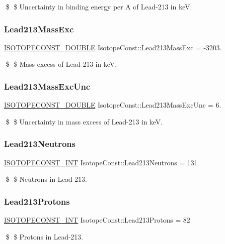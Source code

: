 \$ \$ Uncertainty in binding energy per A of Lead-\/213 in keV. \mbox{\label{group___isotope_const-_lead-_pb213_gabfbf46e8e0e777dba7a1adaa9d711347}} 
\subsubsection{\texorpdfstring{Lead213\+Mass\+Exc}{Lead213MassExc}}
{\footnotesize\ttfamily \mbox{\hyperlink{group___isotope_const-_macros_ga8f45a7272ce02c0b4c65c44636ed719a}{I\+S\+O\+T\+O\+P\+E\+C\+O\+N\+S\+T\+\_\+\+D\+O\+U\+B\+LE}} Isotope\+Const\+::\+Lead213\+Mass\+Exc = -\/3203.}

\$ \$ Mass excess of Lead-\/213 in keV. \mbox{\label{group___isotope_const-_lead-_pb213_ga3eed443824fa9a9b4589a464d3347891}} 
\subsubsection{\texorpdfstring{Lead213\+Mass\+Exc\+Unc}{Lead213MassExcUnc}}
{\footnotesize\ttfamily \mbox{\hyperlink{group___isotope_const-_macros_ga8f45a7272ce02c0b4c65c44636ed719a}{I\+S\+O\+T\+O\+P\+E\+C\+O\+N\+S\+T\+\_\+\+D\+O\+U\+B\+LE}} Isotope\+Const\+::\+Lead213\+Mass\+Exc\+Unc = 6.}

\$ \$ Uncertainty in mass excess of Lead-\/213 in keV. \mbox{\label{group___isotope_const-_lead-_pb213_ga4fbe2f4caef2e83da7bf3b444422f95c}} 
\subsubsection{\texorpdfstring{Lead213\+Neutrons}{Lead213Neutrons}}
{\footnotesize\ttfamily \mbox{\hyperlink{group___isotope_const-_macros_ga5f18360b3e99483a35c32d789e62621c}{I\+S\+O\+T\+O\+P\+E\+C\+O\+N\+S\+T\+\_\+\+I\+NT}} Isotope\+Const\+::\+Lead213\+Neutrons = 131}

\$ \$ Neutrons in Lead-\/213. \mbox{\label{group___isotope_const-_lead-_pb213_gaed8443f41eb70c8d70a56c89ca4ce3fa}} 
\subsubsection{\texorpdfstring{Lead213\+Protons}{Lead213Protons}}
{\footnotesize\ttfamily \mbox{\hyperlink{group___isotope_const-_macros_ga5f18360b3e99483a35c32d789e62621c}{I\+S\+O\+T\+O\+P\+E\+C\+O\+N\+S\+T\+\_\+\+I\+NT}} Isotope\+Const\+::\+Lead213\+Protons = 82}

\$ \$ Protons in Lead-\/213. 